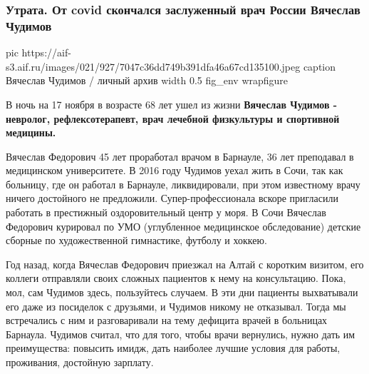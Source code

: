  
 
 
 
 
 
\subsubsection{Утрата. От covid скончался заслуженный врач России Вячеслав Чудимов}
\label{sec:17_11_2020.news.ru.aif.1.covid_death_vjacheslav_chudimov}

\ifcmt
  pic https://aif-s3.aif.ru/images/021/927/7047c36dd749b391dfa46a67cd135100.jpeg
  caption  Вячеслав Чудимов / личный архив 
  width 0.5
  fig_env wrapfigure
\fi


В ночь на 17 ноября в возрасте 68 лет ушел из жизни \textbf{Вячеслав Чудимов -
невролог, рефлексотерапевт, врач лечебной физкультуры и спортивной медицины.}

Вячеслав Федорович 45 лет проработал врачом в Барнауле, 36 лет преподавал в
медицинском университете. В 2016 году Чудимов уехал жить в Сочи, так как
больницу, где он работал в Барнауле, ликвидировали, при этом известному врачу
ничего достойного не предложили. Супер-профессионала вскоре пригласили работать
в престижный оздоровительный центр у моря. В Сочи Вячеслав Федорович курировал
по УМО (углубленное медицинское обследование) детские сборные по художественной
гимнастике,  футболу и хоккею.

Год назад, когда Вячеслав Федорович приезжал на Алтай с коротким визитом, его
коллеги отправляли своих сложных пациентов к нему на консультацию. Пока, мол,
сам Чудимов здесь, пользуйтесь случаем. В эти дни пациенты выхватывали его даже
из посиделок с друзьями, и Чудимов никому не отказывал. Тогда мы  встречались с
ним  и разговаривали на тему дефицита врачей в больницах Барнаула. Чудимов
считал, что для того, чтобы врачи вернулись, нужно дать им преимущества:
повысить имидж, дать наиболее лучшие условия для работы, проживания, достойную
зарплату.

